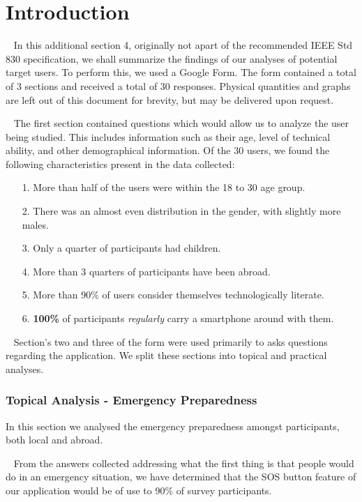 \documentclass{scrreprt}
\begin{document}
\section{Introduction}
\par ~ In this additional section 4, originally not apart of the recommended IEEE Std 830 specification, we shall summarize the findings of our analyses of potential target users. To perform this, we used a Google Form. The form contained a total of 3 sections and received a total of 30 responses. Physical quantities and graphs are left out of this document for brevity, but may be delivered upon request.

\par ~ The first section contained questions which would allow us to analyze the user being studied. This includes information such as their age, level of technical ability, and other demographical information. Of the 30 users, we found the following characteristics present in the data collected:
\begin{enumerate}
	\item[1.] More than half of the users were within the 18 to 30 age group.
	\item[2.] There was an almost even distribution in the gender, with slightly more males.
	\item[3.] Only a quarter of participants had children.
	\item[4.] More than 3 quarters of participants have been abroad.
	\item[5.] More than 90\% of users consider themselves technologically literate.
	\item[6.] \textbf{100\%} of participants \emph{regularly} carry a smartphone around with them.
\end{enumerate}

\par ~ Section's two and three of the form were used primarily to asks questions regarding the application. We split these sections into topical and practical analyses.

\subsubsection{Topical Analysis - Emergency Preparedness}
In this section we analysed the emergency preparedness amongst participants, both local and abroad.

\par ~ From the answers collected addressing what the first thing is that people would do in an emergency situation, we have determined that the SOS button feature of our application would be of use to 90\% of survey participants.
\end{document}
